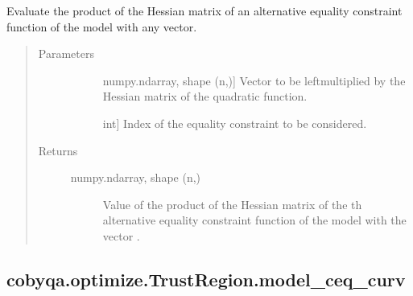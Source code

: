 \documentclass[letterpaper,10pt,english]{sphinxmanual}
\begin{document}
\begin{fulllineitems}
\begin{fulllineitems}
\label{\detokenize{refs/generated/cobyqa.optimize.TrustRegion.model_ceq_alt_hessp:cobyqa.optimize.TrustRegion.model_ceq_alt_hessp}}
\sphinxAtStartPar
Evaluate the product of the Hessian matrix of an alternative equality
constraint function of the model with any vector.
\begin{quote}\begin{description}
\item[{Parameters}] \leavevmode\begin{description}
\item[{}] \leavevmode{[}numpy.ndarray, shape (n,){]}
\sphinxAtStartPar
Vector to be left\sphinxhyphen{}multiplied by the Hessian matrix of the quadratic
function.

\item[{}] \leavevmode{[}int{]}
\sphinxAtStartPar
Index of the equality constraint to be considered.

\end{description}

\item[{Returns}] \leavevmode\begin{description}
\item[{numpy.ndarray, shape (n,)}] \leavevmode
\sphinxAtStartPar
Value of the product of the Hessian matrix of the \sphinxhyphen{}th alternative
equality constraint function of the model with the vector .

\end{description}

\end{description}\end{quote}

\end{fulllineitems}



\subsection{cobyqa.optimize.TrustRegion.model\_ceq\_curv}
\label{\detokenize{refs/generated/cobyqa.optimize.TrustRegion.model_ceq_curv:cobyqa-optimize-trustregion-model-ceq-curv}}\label{\detokenize{refs/generated/cobyqa.optimize.TrustRegion.model_ceq_curv::doc}}


\end{fulllineitems}
\end{document}
